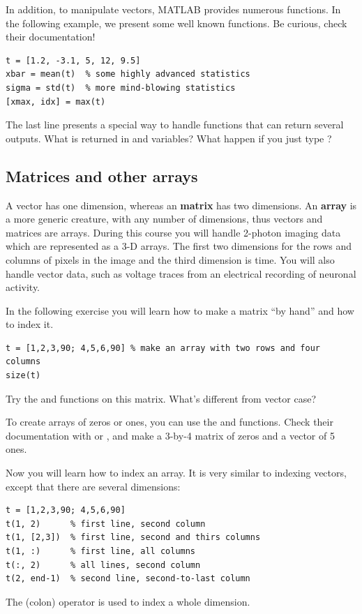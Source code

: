 \documentclass{article}
\begin{document}
In addition, to manipulate vectors, MATLAB provides numerous functions.
In the following example, we present some well known functions.
Be curious, check their documentation!
\begin{lstlisting}
t = [1.2, -3.1, 5, 12, 9.5]
xbar = mean(t)  % some highly advanced statistics
sigma = std(t)  % more mind-blowing statistics
[xmax, idx] = max(t)
\end{lstlisting}
The last line presents a special way to handle functions that can return several outputs.
What is returned in  and  variables?
What happen if you just type ?


\subsection{Matrices and other arrays}

A vector has one dimension, whereas an \textbf{matrix} has two dimensions.
An \textbf{array} is a more generic creature, with any number of dimensions, thus vectors and matrices are arrays.
During this course you will handle 2-photon imaging data which are represented as a 3-D arrays.
The first two dimensions for the rows and columns of pixels in the image and the third dimension is time.
You will also handle vector data, such as voltage traces from an electrical recording of neuronal activity.

In the following exercise you will learn how to make a matrix ``by hand'' and how to index it.
\begin{lstlisting}
t = [1,2,3,90; 4,5,6,90] % make an array with two rows and four columns
size(t)
\end{lstlisting}
Try the  and  functions on this matrix.
What's different from vector case?

To create arrays of zeros or ones, you can use the  and  functions.
Check their documentation with  or , and make a 3-by-4 matrix of zeros and a vector of 5 ones.

Now you will learn how to index an array.
It is very similar to indexing vectors, except that there are several dimensions:
\begin{lstlisting}
t = [1,2,3,90; 4,5,6,90]
t(1, 2)      % first line, second column
t(1, [2,3])  % first line, second and thirs columns
t(1, :)      % first line, all columns
t(:, 2)      % all lines, second column
t(2, end-1)  % second line, second-to-last column
\end{lstlisting}
The \mcode{:} (colon) operator is used to index a whole dimension.
\end{document}
